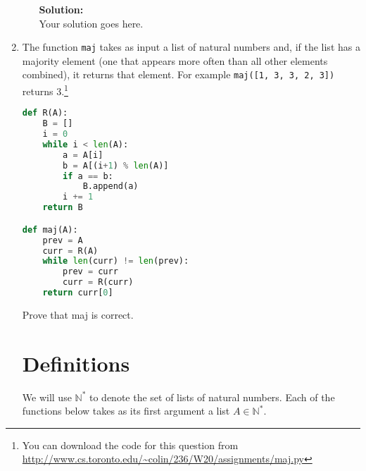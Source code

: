 \documentclass[boldsans]{article}
\newcommand{\N}{\mathbb{N}}
\newenvironment{solution}
{\bigskip \noindent \textbf{Solution: \\}}
{}
\begin{document}
\begin{enumerate}
\begin{enumerate}
\begin{solution}
Your solution goes here.
\end{solution}

\end{enumerate}

\newpage
\item The function \texttt{maj} takes as input a list of natural numbers and, if the list has a majority element (one that appears more often than all other elements combined), it returns that element. For example \texttt{maj([1, 3, 3, 2, 3])} returns 3.\footnote{
You can download the code for this question from \url{http://www.cs.toronto.edu/~colin/236/W20/assignments/maj.py}
}
\begin{lstlisting}[language=Python]
def R(A):
    B = []
    i = 0
    while i < len(A):
        a = A[i]
        b = A[(i+1) % len(A)]
        if a == b:
            B.append(a)
        i += 1
    return B

def maj(A):
    prev = A
    curr = R(A)
    while len(curr) != len(prev):
        prev = curr
        curr = R(curr)
    return curr[0]
\end{lstlisting}

Prove that maj is correct.

\section{Definitions}

\newcommand{\gloss}[1]{
\begin{adjustwidth}{10mm}{}
\textit{ i.e. #1 }
\end{adjustwidth}
}

\newcommand{\COUNT}{\operatorname{COUNT}}
\newcommand{\ad}{\operatorname{ADVANTAGE}}
\newcommand{\maj}{\operatorname{MAJORITY}}
\newcommand{\pairs}{\operatorname{PAIRS}}
\newcommand{\SUCC}{\operatorname{SUCC}}
\newcommand{\R}{\operatorname{R}}

We will use $\N^*$ to denote the set of lists of natural numbers. Each of the functions below takes as its first argument a list $A \in \N^*$.


\end{enumerate}
\end{document}
